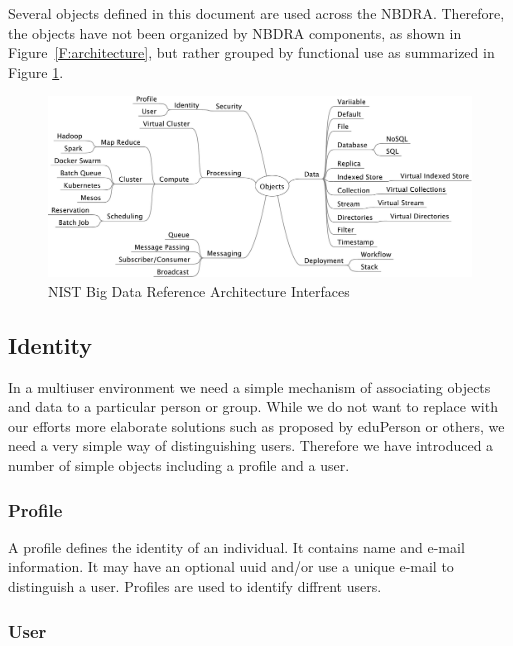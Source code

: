 \documentclass[10pt]{article}
\begin{document}
Several objects defined in this document are used across the NBDRA. 
Therefore, the objects have not been organized by NBDRA components, 
as shown in Figure~\ref{F:architecture}, but rather grouped by functional
use as summarized in Figure \ref{F:interfaces}.

\begin{figure}[h]\centering
\includegraphics[width=1.1\textwidth]{images/interfaces}
\caption{NIST Big Data Reference Architecture Interfaces}
\label{F:interfaces}
\end{figure}


\subsection{Identity}

In a multiuser environment we need a simple mechanism of associating
objects and data to a particular person or group. While we do not want
to replace with our efforts more elaborate solutions such as proposed
by eduPerson \cite{www-eduperson} or others, we need a very simple way
of distinguishing users. Therefore we have introduced a number of
simple objects including a profile and a user.

\subsubsection{Profile}

A profile defines the identity of an individual. It contains name and
e-mail information. It may have an optional uuid and/or use a unique
e-mail to distinguish a user. Profiles are used to identify diffrent
users.


\subsubsection{User}
\end{document}
